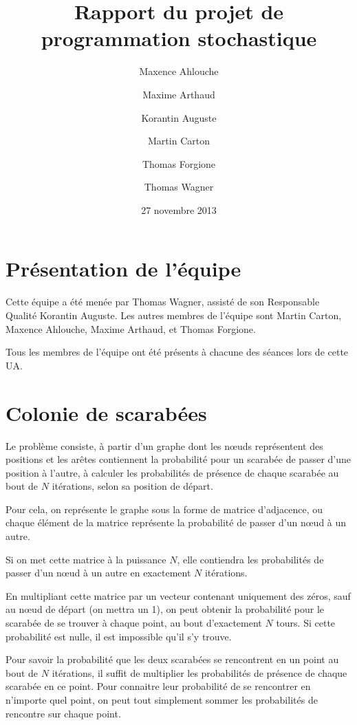 \documentclass{scrartcl}
\begin{document}
\title{Rapport du projet de programmation stochastique}
\author{Maxence Ahlouche \and Maxime Arthaud \and Korantin Auguste
  \and Martin Carton \and Thomas Forgione \and Thomas Wagner}
\date{27 novembre 2013}
\maketitle
\tableofcontents
\newpage

\section{Présentation de l'équipe}
  Cette équipe a été menée par Thomas Wagner, assisté de son Responsable
  Qualité Korantin Auguste. Les autres membres de l'équipe sont Martin Carton,
  Maxence Ahlouche, Maxime Arthaud, et Thomas Forgione.

  Tous les membres de l'équipe ont été présents à chacune des séances lors de
  cette UA.

\section{Colonie de scarabées}
  Le problème consiste, à partir d'un graphe dont les nœuds représentent des
  positions et les arêtes contiennent la probabilité pour un scarabée de passer
  d'une position à l'autre, à calculer les probabilités de présence de chaque
  scarabée au bout de $N$ itérations, selon sa position de départ.

  Pour cela, on représente le graphe sous la forme de matrice d'adjacence, ou
  chaque élément de la matrice représente la probabilité de passer d'un nœud à
  un autre.

  Si on met cette matrice à la puissance $N$, elle contiendra les probabilités
  de passer d'un nœud à un autre en exactement $N$ itérations.

  En multipliant cette matrice par un vecteur contenant uniquement des zéros,
  sauf au nœud de départ (on mettra un 1), on peut obtenir la probabilité pour
  le scarabée de se trouver à chaque point, au bout d'exactement $N$ tours.  Si
  cette probabilité est nulle, il est impossible qu'il s'y trouve.

  Pour savoir la probabilité que les deux scarabées se rencontrent en un point
  au bout de $N$ itérations, il suffit de multiplier les probabilités de
  présence de chaque scarabée en ce point. Pour connaitre leur probabilité de se
  rencontrer en n'importe quel point, on peut tout simplement sommer les
  probabilités de rencontre sur chaque point.
\end{document}
